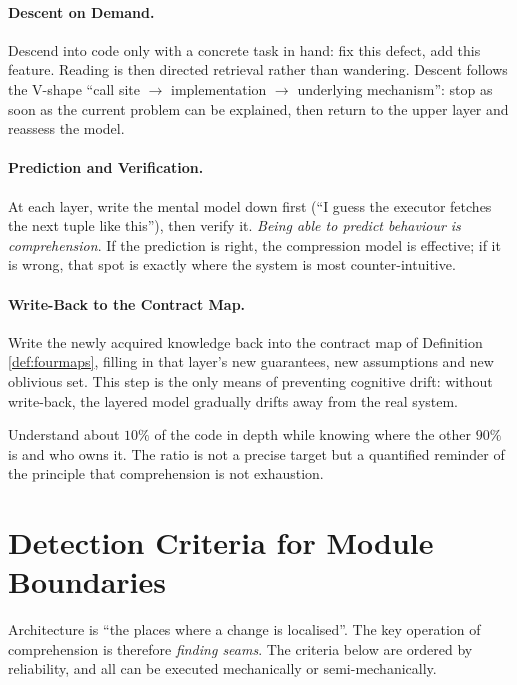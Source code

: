 \paragraph{Descent on Demand.}
Descend into code only with a concrete task in hand: fix this defect, add this feature.
Reading is then directed retrieval rather than wandering. Descent follows the V-shape ``call
site $\to$ implementation $\to$ underlying mechanism'': stop as soon as the current problem
can be explained, then return to the upper layer and reassess the model.

\paragraph{Prediction and Verification.}
At each layer, write the mental model down first (``I guess the executor fetches the next
tuple like this''), then verify it. \emph{Being able to predict behaviour is comprehension}.
If the prediction is right, the compression model is effective; if it is wrong, that spot is
exactly where the system is most counter-intuitive.

\paragraph{Write-Back to the Contract Map.}
Write the newly acquired knowledge back into the contract map of Definition \ref{def:fourmaps},
filling in that layer's new guarantees, new assumptions and new oblivious set. This step is
the only means of preventing cognitive drift: without write-back, the layered model gradually
drifts away from the real system.

\begin{remark}
Understand about $10\%$ of the code in depth while knowing where the other $90\%$ is and who
owns it. The ratio is not a precise target but a quantified reminder of the principle that
comprehension is not exhaustion.
\end{remark}

\section{Detection Criteria for Module Boundaries}\label{sec:seams}

Architecture is ``the places where a change is localised''. The key operation of comprehension
is therefore \emph{finding seams}. The criteria below are ordered by reliability, and all can
be executed mechanically or semi-mechanically.

